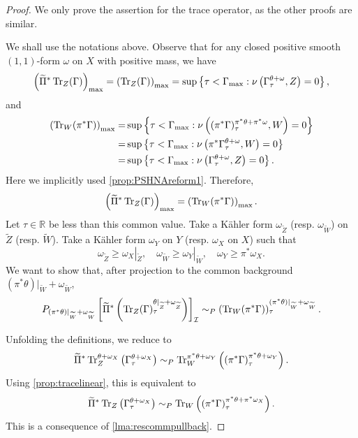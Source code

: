 \begin{proof}
We only prove the assertion for the trace operator, as the other proofs are similar.

We shall use the notations above. Observe that for any closed positive smooth $(1,1)$-form $\omega$ on $X$ with positive mass, we have
\[
\left(\widetilde{\Pi}^* \operatorname{Tr}_Z(\Gamma)\right)_{\max}=\left( \operatorname{Tr}_Z(\Gamma)\right)_{\max}=\sup\left\{ \tau<\Gamma_{\max}: \nu\left(\Gamma^{\theta+\omega}_{\tau},Z\right)=0 \right\},
\]
and
\[
\begin{aligned}
\left(\operatorname{Tr}_W(\pi^*\Gamma)\right)_{\max}=&\sup\left\{ \tau<\Gamma_{\max}: \nu\left((\pi^*\Gamma)^{\pi^*\theta+\pi^*\omega}_{\tau},W\right)=0 \right\}\\
=&\sup\left\{ \tau<\Gamma_{\max}: \nu\left(\pi^*\Gamma^{\theta+\omega}_{\tau},W\right)=0 \right\}\\
=& \sup\left\{ \tau<\Gamma_{\max}: \nu\left(\Gamma^{\theta+\omega}_{\tau},Z\right)=0 \right\}.
\end{aligned}
\]
Here we implicitly used \cref{prop:PSHNAreform1}.
Therefore,
\[
\left(\widetilde{\Pi}^* \operatorname{Tr}_Z(\Gamma)\right)_{\max}=\left(\operatorname{Tr}_W(\pi^*\Gamma)\right)_{\max}.
\]
Let $\tau\in \mathbb{R}$ be less than this common value. Take a K\"ahler form $\omega_{\widetilde{Z}}$ (resp. $\omega_{\widetilde{W}}$) on $\widetilde{Z}$ (resp. $\widetilde{W}$).
Take a K\"ahler form $\omega_Y$ on $Y$ (resp. $\omega_X$ on $X$) such that
\[
\omega_{\widetilde{Z}}\geq \omega_X|_{\widetilde{Z}},\quad \omega_{\widetilde{W}} \geq \omega_Y|_{\widetilde{W}},\quad \omega_Y \geq \pi^*\omega_X.
\]
We want to show that, after projection to the common background $(\pi^*\theta)|_{\widetilde{W}}+\omega_{\widetilde{W}}$,
\[
P_{(\pi^*\theta)|_{\widetilde{W}}+\omega_{\widetilde{W}}}\left[\widetilde{\Pi}^*\left(\operatorname{Tr}_Z(\Gamma)^{\theta|_{\widetilde{Z}}+\omega_{\widetilde{Z}}}_\tau\right)\right]_{\mathcal I} \sim_P
\left(\operatorname{Tr}_W(\pi^*\Gamma)\right)^{(\pi^*\theta)|_{\widetilde{W}}+\omega_{\widetilde{W}}}_\tau.
\]

Unfolding the definitions, we reduce to
\[
\widetilde{\Pi}^* \operatorname{Tr}_Z^{\theta+\omega_X}\left( \Gamma^{\theta+\omega_X}_{\tau} \right)\sim_P \operatorname{Tr}_{W}^{\pi^*\theta+\omega_Y}\left( \left( \pi^*\Gamma\right)^{\pi^*\theta+\omega_Y}_{\tau}\right).
\]
Using \cref{prop:tracelinear}, this is equivalent to
\[
\widetilde{\Pi}^* \operatorname{Tr}_Z\left( \Gamma^{\theta+\omega_X}_{\tau} \right)\sim_P \operatorname{Tr}_{W}\left( \left( \pi^*\Gamma\right)^{\pi^*\theta+\pi^*\omega_X}_{\tau}\right).
\]
This is a consequence of \cref{lma:rescommpullback}.
\end{proof}


